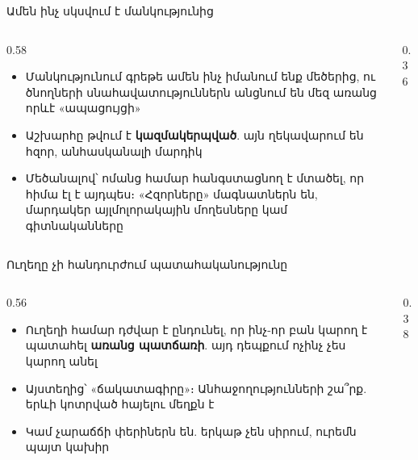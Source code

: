 \begin{frame}{Ամեն ինչ սկսվում է մանկությունից}
  \begin{columns}[c]
    \begin{column}{0.58\textwidth}
      \begin{itemize}
        \item Մանկությունում գրեթե ամեն ինչ իմանում ենք մեծերից, ու ծնողների սնահավատություններն անցնում են մեզ առանց որևէ «ապացույցի»
        \item<2-> Աշխարհը թվում է \textbf{կազմակերպված}. այն ղեկավարում են հզոր, անհասկանալի մարդիկ
        \item<3-> Մեծանալով՝ ոմանց համար հանգստացնող է մտածել, որ հիմա էլ է այդպես։ «Հզորները» մագնատներն են, մարդակեր այլմոլորակային մողեսները կամ գիտնականները
      \end{itemize}
    \end{column}
    \begin{column}{0.36\textwidth}
      \centering
      \ \par\medskip
    \end{column}
  \end{columns}
\end{frame}

\begin{frame}{Ուղեղը չի հանդուրժում պատահականությունը}
  \begin{columns}[c]
    \begin{column}{0.56\textwidth}
      \begin{itemize}
        \item Ուղեղի համար դժվար է ընդունել, որ ինչ-որ բան կարող է պատահել \textbf{առանց պատճառի}. այդ դեպքում ոչինչ չես կարող անել
        \item<2-> Այստեղից՝ «ճակատագիրը»։ Անհաջողությունների շա՞րք. երևի կոտրված հայելու մեղքն է 
        \item<3-> Կամ չարաճճի փերիներն են. երկաթ չեն սիրում, ուրեմն պայտ կախիր
      \end{itemize}
    \end{column}
    \begin{column}{0.38\textwidth}
      \centering
    \end{column}
  \end{columns}
  \vspace{2mm}
\end{frame}

